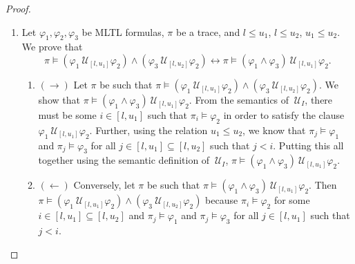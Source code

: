 \documentclass{article}
\begin{document}
\begin{proof}
\begin{enumerate}
    \item[(R7):] Let $\varphi_1,\varphi_2,\varphi_3$ be MLTL formulas, $\pi$ be a trace, and $l \leq u_1$, $l \leq u_2$, $u_1 \leq u_2$. We prove that 
$$
\pi \models ({\varphi_1}\ \mathcal{U}_{[l,u_1]}{\varphi_2}) \land ({\varphi_3}\ \mathcal{U}_{[l,u_2]}{\varphi_2}) \leftrightarrow \pi \models  {(\varphi_1 \land \varphi_3)}\ \mathcal{U}_{[l,u_1]}{\varphi_2}.
$$

    \begin{enumerate}
    \item  $(\rightarrow)$
        Let $\pi$ be such that $\pi \models ({\varphi_1}\ \mathcal{U}_{[l,u_1]}{\varphi_2}) \land ({\varphi_3}\ \mathcal{U}_{[l,u_2]}{\varphi_2})$. We show that $\pi \models {(\varphi_1 \land \varphi_3)}\ \mathcal{U}_{[l,u_1]}{\varphi_2}$.
        From the semantics of $\ \mathcal{U}_{I}{}$, there must be some $i \in [l,u_1]$ such that $\pi_i \models \varphi_2$ in order to satisfy the clause ${\varphi_1}\ \mathcal{U}_{[l,u_1]}{\varphi_2}$. 
        Further, using the relation $u_1 \leq u_2$, we know that $\pi_j \models \varphi_1$ and $\pi_j \models \varphi_3$ for all $j \in [l,u_1] \subseteq [l,u_2]$ such that $j < i$.
        Putting this all together using the semantic definition of $\ \mathcal{U}_{I}{}$, $\pi \models {(\varphi_1 \land \varphi_3)}\ \mathcal{U}_{[l,u_1]}{\varphi_2}$. 
    
    \item  $(\leftarrow)$
        Conversely, let $\pi$ be such that $\pi \models {(\varphi_1 \land \varphi_3)}\ \mathcal{U}_{[l,u_1]}{\varphi_2}$.
        Then $\pi \models ({\varphi_1}\ \mathcal{U}_{[l,u_1]}{\varphi_2}) \land ({\varphi_3}\ \mathcal{U}_{[l,u_2]}{\varphi_2})$ because $\pi_i \models \varphi_2$ for some $i \in [l,u_1] \subseteq [l,u_2]$ and $\pi_j \models \varphi_1$ and $\pi_j \models \varphi_3$ for all $j \in [l,u_1]$ such that $j < i$.
    
    \end{enumerate}


\end{enumerate}
\end{proof}
\end{document}
